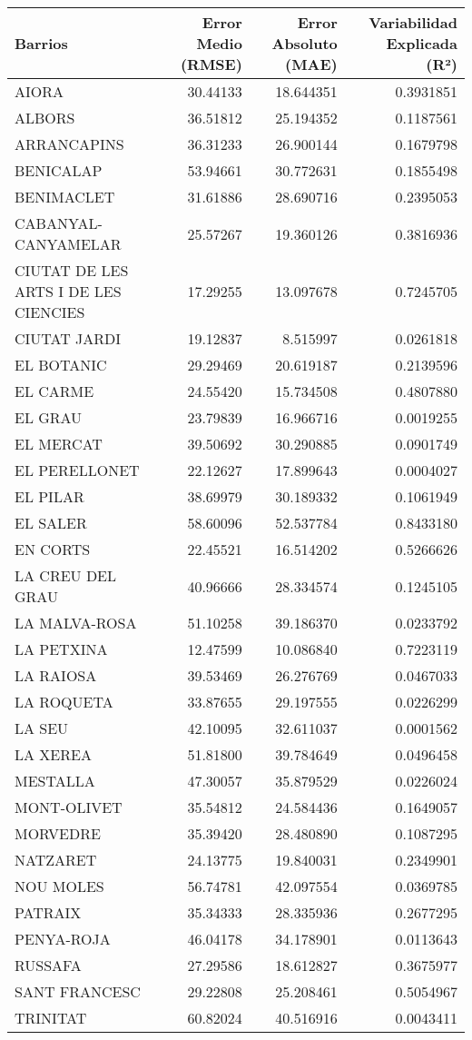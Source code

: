 \documentclass[
]{article}
\begin{document}
\begin{longtable}[t]{lrrr}
\toprule
Barrios & Error Medio (RMSE) & Error Absoluto (MAE) & Variabilidad Explicada (R²)\\
\midrule
AIORA & 30.44133 & 18.644351 & 0.3931851\\
ALBORS & 36.51812 & 25.194352 & 0.1187561\\
ARRANCAPINS & 36.31233 & 26.900144 & 0.1679798\\
BENICALAP & 53.94661 & 30.772631 & 0.1855498\\
BENIMACLET & 31.61886 & 28.690716 & 0.2395053\\
\addlinespace
CABANYAL-CANYAMELAR & 25.57267 & 19.360126 & 0.3816936\\
CIUTAT DE LES ARTS I DE LES CIENCIES & 17.29255 & 13.097678 & 0.7245705\\
CIUTAT JARDI & 19.12837 & 8.515997 & 0.0261818\\
EL BOTANIC & 29.29469 & 20.619187 & 0.2139596\\
EL CARME & 24.55420 & 15.734508 & 0.4807880\\
\addlinespace
EL GRAU & 23.79839 & 16.966716 & 0.0019255\\
EL MERCAT & 39.50692 & 30.290885 & 0.0901749\\
EL PERELLONET & 22.12627 & 17.899643 & 0.0004027\\
EL PILAR & 38.69979 & 30.189332 & 0.1061949\\
EL SALER & 58.60096 & 52.537784 & 0.8433180\\
\addlinespace
EN CORTS & 22.45521 & 16.514202 & 0.5266626\\
LA CREU DEL GRAU & 40.96666 & 28.334574 & 0.1245105\\
LA MALVA-ROSA & 51.10258 & 39.186370 & 0.0233792\\
LA PETXINA & 12.47599 & 10.086840 & 0.7223119\\
LA RAIOSA & 39.53469 & 26.276769 & 0.0467033\\
\addlinespace
LA ROQUETA & 33.87655 & 29.197555 & 0.0226299\\
LA SEU & 42.10095 & 32.611037 & 0.0001562\\
LA XEREA & 51.81800 & 39.784649 & 0.0496458\\
MESTALLA & 47.30057 & 35.879529 & 0.0226024\\
MONT-OLIVET & 35.54812 & 24.584436 & 0.1649057\\
\addlinespace
MORVEDRE & 35.39420 & 28.480890 & 0.1087295\\
NATZARET & 24.13775 & 19.840031 & 0.2349901\\
NOU MOLES & 56.74781 & 42.097554 & 0.0369785\\
PATRAIX & 35.34333 & 28.335936 & 0.2677295\\
PENYA-ROJA & 46.04178 & 34.178901 & 0.0113643\\
\addlinespace
RUSSAFA & 27.29586 & 18.612827 & 0.3675977\\
SANT FRANCESC & 29.22808 & 25.208461 & 0.5054967\\
TRINITAT & 60.82024 & 40.516916 & 0.0043411\\
\bottomrule
\end{longtable}
\end{document}
